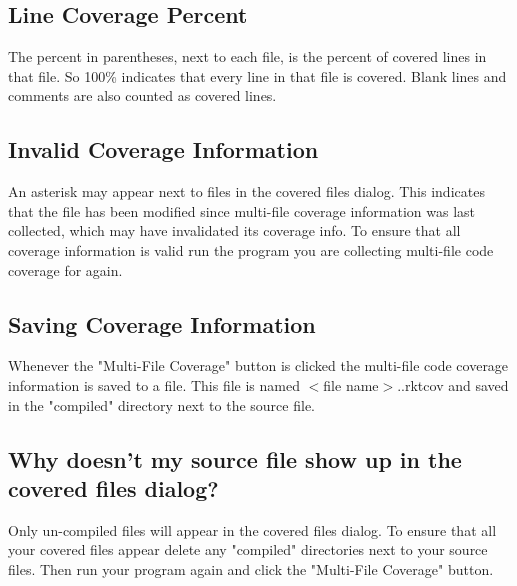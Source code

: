 \documentclass{article}
\newcommand{\postDoc}{}
\begin{document}
\subsection[Line Coverage Percent]{Line Coverage Percent}\label{t:x28part_x22Linex5fCoveragex5fPercentx22x29}

The percent in parentheses, next to each file, is the percent of covered lines in that file. So 100\% indicates that every line in that file is covered. Blank lines and comments are also counted as covered lines.

\subsection[Invalid Coverage Information]{Invalid Coverage Information}\label{t:x28part_x22Invalidx5fCoveragex5fInformationx22x29}

An asterisk may appear next to files in the covered files dialog. This indicates that the file has been modified since multi{-}file coverage information was last collected, which may have invalidated its coverage info. To ensure that all coverage information is valid run the program you are collecting multi{-}file code coverage for again.

\subsection[Saving Coverage Information]{Saving Coverage Information}\label{t:x28part_x22Savingx5fCoveragex5fInformationx22x29}

Whenever the "Multi{-}File Coverage" button is clicked the multi{-}file code coverage information is saved to a file. This file is named $<$file name$>$..rktcov and saved in the "compiled" directory next to the source file.

\subsection[Why doesn{'}t my source file show up in the covered files dialog?]{Why doesn{'}t my source file show up in the covered files dialog?}\label{t:x28part_x22Whyx5fdoesnx5ftx5fmyx5fsourcex5ffilex5fshowx5fupx5finx5fthex5fcoveredx5ffilesx5fdialogx5fx22x29}

Only un{-}compiled files will appear in the covered files dialog. To ensure that all your covered files appear delete any "compiled" directories next to your source files. Then run your program again and click the "Multi{-}File Coverage" button.

\postDoc
\end{document}
